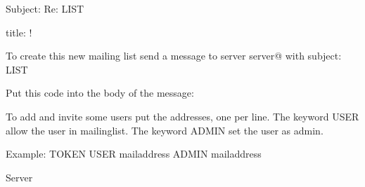 Subject: Re: LIST %

title: !

To create this new mailing list send a message to server server@%
with subject:
LIST %

Put this code into the body of the message:

To add and invite some users put the addresses, one per line.
The keyword USER allow the user in mailinglist.
The keyword ADMIN set the user as admin.

Example:
TOKEN %
USER mailaddress
ADMIN mailaddress

Server %